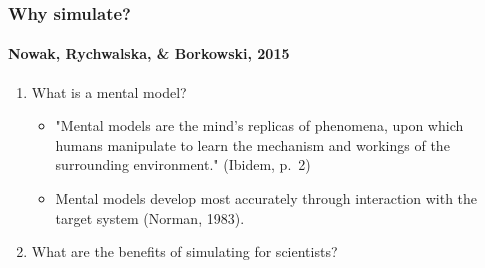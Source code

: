 \documentclass{beamer}
\begin{document}
\begin{frame}
{
   }

\end{frame}

\begin{frame}
   \frametitle{Why simulate?}
   \framesubtitle{Nowak, Rychwalska, \& Borkowski, 2015}
   \begin{enumerate}
      \item What is a mental model?
         \begin{itemize}
            \item "Mental models are the mind's replicas of phenomena, upon
            which humans manipulate to learn the mechanism and workings of the
            surrounding environment." (Ibidem, p.~2)
            \item Mental models develop most accurately through interaction with
            the target system (Norman, 1983).
         \end{itemize}
      \item What are the benefits of simulating for scientists?
   \end{enumerate}
\end{frame}
\end{document}
